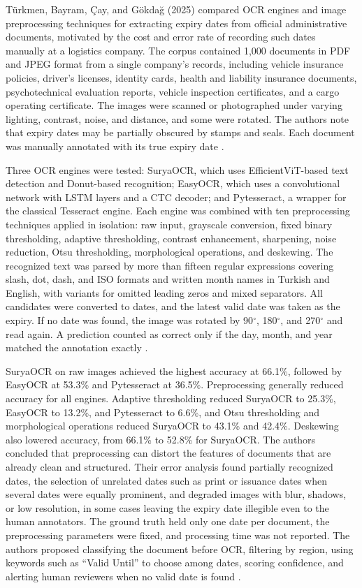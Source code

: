 T\"urkmen, Bayram, \c{C}ay, and G\"okda\u{g} (2025) compared OCR engines and image preprocessing techniques for extracting expiry dates from official administrative documents, motivated by the cost and error rate of recording such dates manually at a logistics company.
The corpus contained 1,000 documents in PDF and JPEG format from a single company's records, including vehicle insurance policies, driver's licenses, identity cards, health and liability insurance documents, psychotechnical evaluation reports, vehicle inspection certificates, and a cargo operating certificate.
The images were scanned or photographed under varying lighting, contrast, noise, and distance, and some were rotated.
The authors note that expiry dates may be partially obscured by stamps and seals.
Each document was manually annotated with its true expiry date \cite{docxb2}.

Three OCR engines were tested: SuryaOCR, which uses EfficientViT-based text detection and Donut-based recognition; EasyOCR, which uses a convolutional network with LSTM layers and a CTC decoder; and Pytesseract, a wrapper for the classical Tesseract engine.
Each engine was combined with ten preprocessing techniques applied in isolation: raw input, grayscale conversion, fixed binary thresholding, adaptive thresholding, contrast enhancement, sharpening, noise reduction, Otsu thresholding, morphological operations, and deskewing.
The recognized text was parsed by more than fifteen regular expressions covering slash, dot, dash, and ISO formats and written month names in Turkish and English, with variants for omitted leading zeros and mixed separators.
All candidates were converted to dates, and the latest valid date was taken as the expiry.
If no date was found, the image was rotated by 90$^\circ$, 180$^\circ$, and 270$^\circ$ and read again.
A prediction counted as correct only if the day, month, and year matched the annotation exactly \cite{docxb2}.

SuryaOCR on raw images achieved the highest accuracy at 66.1\%, followed by EasyOCR at 53.3\% and Pytesseract at 36.5\%.
Preprocessing generally reduced accuracy for all engines.
Adaptive thresholding reduced SuryaOCR to 25.3\%, EasyOCR to 13.2\%, and Pytesseract to 6.6\%, and Otsu thresholding and morphological operations reduced SuryaOCR to 43.1\% and 42.4\%.
Deskewing also lowered accuracy, from 66.1\% to 52.8\% for SuryaOCR.
The authors concluded that preprocessing can distort the features of documents that are already clean and structured.
Their error analysis found partially recognized dates, the selection of unrelated dates such as print or issuance dates when several dates were equally prominent, and degraded images with blur, shadows, or low resolution, in some cases leaving the expiry date illegible even to the human annotators.
The ground truth held only one date per document, the preprocessing parameters were fixed, and processing time was not reported.
The authors proposed classifying the document before OCR, filtering by region, using keywords such as ``Valid Until'' to choose among dates, scoring confidence, and alerting human reviewers when no valid date is found \cite{docxb2}.

